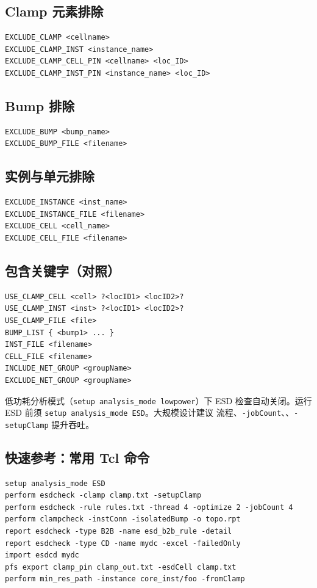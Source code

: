 \subsection{Clamp 元素排除}
\begin{lstlisting}
EXCLUDE_CLAMP <cellname>
EXCLUDE_CLAMP_INST <instance_name>
EXCLUDE_CLAMP_CELL_PIN <cellname> <loc_ID>
EXCLUDE_CLAMP_INST_PIN <instance_name> <loc_ID>
\end{lstlisting}

\subsection{Bump 排除}
\begin{lstlisting}
EXCLUDE_BUMP <bump_name>
EXCLUDE_BUMP_FILE <filename>
\end{lstlisting}

\subsection{实例与单元排除}
\begin{lstlisting}
EXCLUDE_INSTANCE <inst_name>
EXCLUDE_INSTANCE_FILE <filename>
EXCLUDE_CELL <cell_name>
EXCLUDE_CELL_FILE <filename>
\end{lstlisting}

\subsection{包含关键字（对照）}
\begin{lstlisting}
USE_CLAMP_CELL <cell> ?<locID1> <locID2>?
USE_CLAMP_INST <inst> ?<locID1> <locID2>?
USE_CLAMP_FILE <file>
BUMP_LIST { <bump1> ... }
INST_FILE <filename>
CELL_FILE <filename>
INCLUDE_NET_GROUP <groupName>
EXCLUDE_NET_GROUP <groupName>
\end{lstlisting}

\begin{noteBox}
低功耗分析模式（\texttt{setup analysis\_mode lowpower}）下 ESD 检查自动关闭。运行 ESD 前须 \texttt{setup analysis\_mode ESD}。大规模设计建议  流程、\texttt{-jobCount}、、\texttt{-setupClamp} 提升吞吐。
\end{noteBox}

\subsection{快速参考：常用 Tcl 命令}
\begin{lstlisting}
setup analysis_mode ESD
perform esdcheck -clamp clamp.txt -setupClamp
perform esdcheck -rule rules.txt -thread 4 -optimize 2 -jobCount 4
perform clampcheck -instConn -isolatedBump -o topo.rpt
report esdcheck -type B2B -name esd_b2b_rule -detail
report esdcheck -type CD -name mydc -excel -failedOnly
import esdcd mydc
pfs export clamp_pin clamp_out.txt -esdCell clamp.txt
perform min_res_path -instance core_inst/foo -fromClamp
\end{lstlisting}
